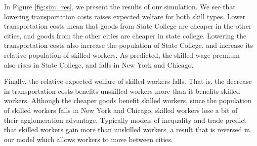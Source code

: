 \documentclass{article}
\begin{document}
In Figure \ref{fig:sim_res}, we present the results of our simulation.  We see that lowering transportation costs raises expected welfare for both skill types.  Lower transportation costs mean that goods from State College are cheaper in the other cities, and goods from the other cities are cheaper in state college.  Lowering the transportation costs also increase the population of State College, and increase its relative population of skilled workers.  As predicted, the skilled wage premium also rises in State College, and falls in New York and Chicago.  

Finally, the relative expected welfare of skilled workers falls.  That is, the decrease in transportation costs benefits unskilled workers more than it benefits skilled workers.  Although the cheaper goods benefit skilled workers, since the population of skilled workers falls in New York and Chicago, skilled workers lose a bit of their agglomeration advantage.  Typically models of inequality and trade predict that skilled workers gain more than unskilled workers, a result that is reversed in our model which allows workers to move between cities.
\end{document}
